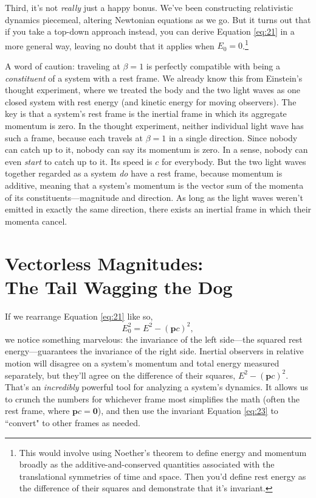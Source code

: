 \documentclass[12pt]{article}
\renewcommand{\vv}[1]{\mathbf{#1}}
\begin{document}
Third, it's not \emph{really} just a happy bonus. We've been constructing relativistic dynamics piecemeal, altering Newtonian equations as we go. But it turns out that if you take a top-down approach instead, you can derive Equation \ref{eq:21} in a more general way, leaving no doubt that it applies when $E_0 = 0$.\footnote{This would involve using Noether's theorem to define energy and momentum broadly as the additive-and-conserved quantities associated with the translational symmetries of time and space. Then you'd define rest energy as the difference of their squares and demonstrate that it's invariant.}

A word of caution: traveling at $\beta = 1$ is perfectly compatible with being a \emph{constituent} of a system with a rest frame. We already know this from Einstein's thought experiment, where we treated the body and the two light waves as one closed system with rest energy (and kinetic energy for moving observers). The key is that a system's rest frame is the inertial frame in which its aggregate momentum is zero. In the thought experiment, neither individual light wave has such a frame, because each travels at $\beta = 1$ in a single direction. Since nobody can catch up to it, nobody can say its momentum is zero. In a sense, nobody can even \emph{start} to catch up to it. Its speed is $c$ for everybody. But the two light waves together regarded as a system \emph{do} have a rest frame, because momentum is additive, meaning that a system's momentum is the vector sum of the momenta of its constituents---magnitude and direction. As long as the light waves weren't emitted in exactly the same direction, there exists an inertial frame in which their momenta cancel.



\section{Vectorless Magnitudes:\\ The Tail Wagging the Dog}

If we rearrange Equation \ref{eq:21} like so,
\begin{equation}\label{eq:23}
E_0^2=E^2-(\vv p c)^2,
\end{equation}
we notice something marvelous: the invariance of the left side---the squared rest energy---guarantees the invariance of the right side. Inertial observers in relative motion will disagree on a system's momentum and total energy measured separately, but they'll agree on the difference of their squares, $E^2-(\vv p c)^2$. That's an \emph{incredibly} powerful tool for analyzing a system's dynamics. It allows us to crunch the numbers for whichever frame most simplifies the math (often the rest frame, where $\vv p c = \vv 0$), and then use the invariant Equation \ref{eq:23} to ``convert" to other frames as needed.
\end{document}
